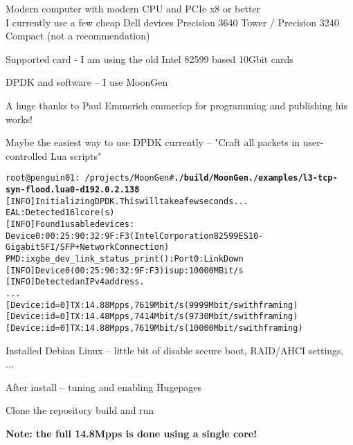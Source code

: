 \documentclass[Screen16to9,17pt]{foils}
\begin{document}


\begin{list2}
\item Modern computer with modern CPU and PCIe x8 or better\\
I currently use a few cheap Dell devices Precision 3640 Tower / Precision 3240 Compact (not a recommendation)
\item Supported card - I am using the old Intel 82599 based 10Gbit cards
\item DPDK and software -- I use MoonGen 
\item A huge thanks to Paul Emmerich emmericp for programming and publishing his works!
\item Maybe the easiest way to use DPDK currently -- "Craft all packets in user-controlled Lua scripts"
\end{list2}



\begin{alltt}\footnotesize
root@penguin01:~/projects/MoonGen# {\bfseries ./build/MoonGen ./examples/l3-tcp-syn-flood.lua 0 -d 192.0.2.138}
[INFO]  Initializing DPDK. This will take a few seconds...
EAL: Detected 16 lcore(s)
[INFO]  Found 1 usable devices:
   Device 0: 00:25:90:32:9F:F3 (Intel Corporation 82599ES 10-Gigabit SFI/SFP+ Network Connection)
PMD: ixgbe_dev_link_status_print():  Port 0: Link Down
[INFO]  Device 0 (00:25:90:32:9F:F3) is up: 10000 MBit/s
[INFO]  Detected an IPv4 address.
...
[Device: id=0] TX: 14.88 Mpps, 7619 Mbit/s (9999 Mbit/s with framing)
[Device: id=0] TX: 14.48 Mpps, 7414 Mbit/s (9730 Mbit/s with framing)
[Device: id=0] TX: 14.88 Mpps, 7619 Mbit/s (10000 Mbit/s with framing)
\end{alltt}

\begin{list2}
\item Installed Debian Linux -- little bit of disable secure boot, RAID/AHCI settings, ...
\item After install -- tuning and enabling Hugepages
\item Clone the repository  build and run
\item {\bf Note: the full 14.8Mpps is done using a single core!}
\end{list2}

\end{document}
